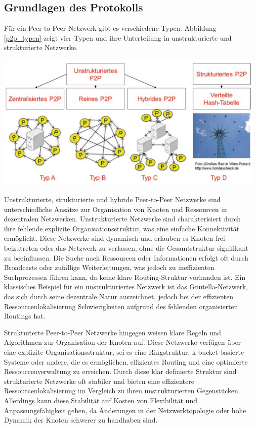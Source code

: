 \subsection{Grundlagen des Protokolls}

Für ein Peer-to-Peer Netzwerk gibt es verschiedene Typen. Abbildung \ref{p2p_typen} zeigt 
vier Typen und ihre Unterteilung in unstrukturierte und strukturierte Netzwerke.

\begin{center}
    \captionsetup{type=figure}
    \includegraphics[width=1\linewidth]{images/peer_to_peer_typen.png}
    \label{p2p_typen}
\end{center}

\noindent Unstrukturierte, strukturierte und hybride Peer-to-Peer Netzwerke sind unterschiedliche Ansätze zur Organisation von Knoten und Ressourcen in dezentralen Netzwerken. Unstrukturierte Netzwerke sind charakterisiert durch ihre fehlende explizite Organisationsstruktur, was eine einfache Konnektivität ermöglicht. Diese Netzwerke sind dynamisch und erlauben es Knoten frei beizutreten oder das Netzwerk zu verlassen, ohne die Gesamtstruktur signifikant zu beeinflussen. Die Suche nach Ressourcen oder Informationen erfolgt oft durch Broadcasts oder zufällige Weiterleitungen, was jedoch zu ineffizienten Suchprozessen führen kann, da keine klare Routing-Struktur vorhanden ist. Ein klassisches Beispiel für ein unstrukturiertes Netzwerk ist das Gnutella-Netzwerk, das sich durch seine dezentrale Natur auszeichnet, jedoch bei der effizienten Ressourcenlokalisierung Schwierigkeiten aufgrund des fehlenden organisierten Routings hat.

Strukturierte Peer-to-Peer Netzwerke hingegen weisen klare Regeln und Algorithmen zur Organisation der Knoten auf. Diese Netzwerke verfügen über eine explizite Organisationsstruktur, sei es eine Ringstruktur, k-bucket basierte Systeme oder andere, die es ermöglichen, effizientes Routing und eine optimierte Ressourcenverwaltung zu erreichen. Durch diese klar definierte Struktur sind strukturierte Netzwerke oft stabiler und bieten eine effizientere Ressourcenlokalisierung im Vergleich zu ihren unstrukturierten Gegenstücken. Allerdings kann diese Stabilität auf Kosten von Flexibilität und Anpassungsfähigkeit gehen, da Änderungen in der Netzwerktopologie oder hohe Dynamik der Knoten schwerer zu handhaben sind.

